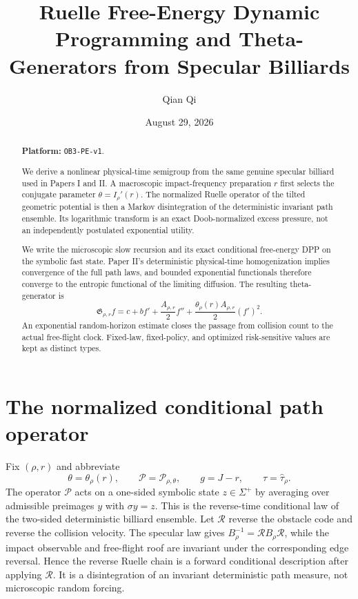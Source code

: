 \documentclass[11pt,reqno]{amsart}
\title[Ruelle free energy and theta-generators]{Ruelle Free-Energy Dynamic Programming and Theta-Generators from Specular Billiards}
\author{Qian Qi}
\date{August 29, 2026}
\theoremstyle{definition}
\theoremstyle{remark}
\newcommand{\cP}{\mathcal P}
\begin{document}
\raggedbottom
\begin{abstract}
\noindent\textbf{Platform: }\texttt{OB3-PE-v1}.\par
We derive a nonlinear physical-time semigroup from the same genuine specular
billiard used in Papers I and II.  A macroscopic impact-frequency preparation
$r$ first selects the conjugate parameter
$\theta=I_\rho'(r)$.  The normalized Ruelle operator of the tilted geometric
potential is then a Markov disintegration of the deterministic invariant path
ensemble.  Its logarithmic transform is an exact Doob-normalized excess
pressure, not an independently postulated exponential utility.

We write the microscopic slow recursion and its exact conditional free-energy
DPP on the symbolic fast state.  Paper II's deterministic physical-time
homogenization implies convergence of the full path laws, and bounded
exponential functionals therefore converge to the entropic functional of the
limiting diffusion.  The resulting theta-generator is
\[
 \mathfrak G_{\rho,r}f
 =c+b f'+\frac{A_{\rho,r}}2f''
 +\frac{\theta_\rho(r)A_{\rho,r}}2(f')^2.
\]
An exponential random-horizon estimate closes the passage from collision count
to the actual free-flight clock.  Fixed-law, fixed-policy, and optimized
risk-sensitive values are kept as distinct types.
\end{abstract}
\maketitle
\tableofcontents

\section{The normalized conditional path operator}\label{sec:path-op}
Fix $(\rho,r)$ and abbreviate
\[
 \theta=\theta_\rho(r),\qquad
 \cP=\cP_{\rho,\theta},\qquad
 g=J-r,\qquad
 \tau=\widehat\tau_\rho.
\]
The operator $\cP$ acts on a one-sided symbolic state $z\in\Sigma^+$ by
averaging over admissible preimages $y$ with $\sigma y=z$.  This is the
reverse-time conditional law of the two-sided deterministic billiard ensemble.
Let $\mathscr R$ reverse the obstacle code and reverse the collision velocity.
The specular law gives
$B_\rho^{-1}=\mathscr R B_\rho\mathscr R$, while the impact observable and
free-flight roof are invariant under the corresponding edge reversal.  Hence
the reverse Ruelle chain is a forward conditional description after applying
$\mathscr R$.  It is a disintegration of an invariant deterministic path
measure, not microscopic random forcing.
\end{document}
